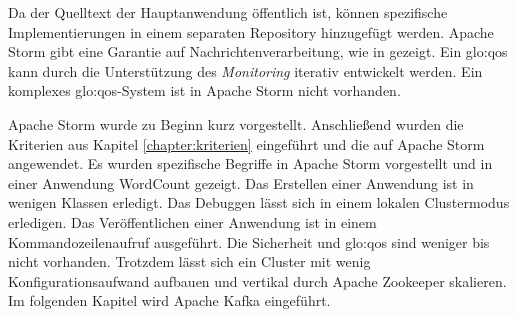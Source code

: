Da der Quelltext der Hauptanwendung öffentlich ist, können spezifische Implementierungen in einem separaten Repository hinzugefügt werden. Apache Storm gibt eine Garantie auf Nachrichtenverarbeitung, wie in  gezeigt. Ein \gls{glo:qos} kann durch die Unterstützung des \textit{Monitoring} iterativ entwickelt werden. Ein komplexes \gls{glo:qos}-System ist in Apache Storm nicht vorhanden.

Apache Storm wurde zu Beginn kurz vorgestellt. Anschließend wurden die Kriterien aus Kapitel \ref{chapter:kriterien} eingeführt und die auf Apache Storm angewendet. Es wurden spezifische Begriffe in Apache Storm vorgestellt und in einer Anwendung WordCount gezeigt. Das Erstellen einer Anwendung ist in wenigen Klassen erledigt. Das Debuggen lässt sich in einem lokalen Clustermodus erledigen. Das Veröffentlichen einer Anwendung ist in einem Kommandozeilenaufruf ausgeführt. Die Sicherheit und \gls{glo:qos} sind weniger bis nicht vorhanden. Trotzdem lässt sich ein Cluster mit wenig Konfigurationsaufwand aufbauen und vertikal durch Apache Zookeeper skalieren. Im folgenden Kapitel wird Apache Kafka eingeführt.

